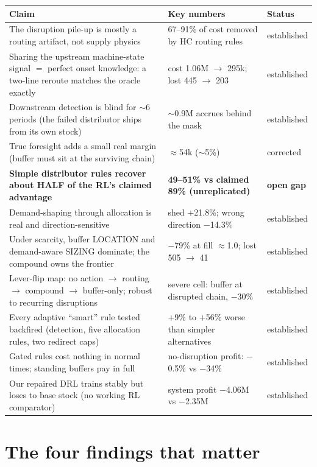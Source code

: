 \documentclass[11pt]{article}
\begin{document}
\begin{table}[h]
\centering\small
\begin{tabular}{@{}p{9.4cm} p{4.3cm} l@{}}
\toprule
\textbf{Claim} & \textbf{Key numbers} & \textbf{Status} \\
\midrule
The disruption pile-up is mostly a routing artifact, not supply physics &
67--91\% of cost removed by HC routing rules & established \\
Sharing the upstream machine-state signal $=$ perfect onset knowledge: a two-line
reroute matches the oracle exactly &
cost 1.06M $\to$ 295k; lost 445 $\to$ 203 & established \\
Downstream detection is blind for $\sim$6 periods (the failed distributor ships from
its own stock) &
$\sim$0.9M accrues behind the mask & established \\
True foresight adds a small real margin (buffer must sit at the surviving chain) &
$\approx$54k ($\sim$5\%) & corrected \\
\textbf{Simple distributor rules recover about HALF of the RL's claimed advantage} &
\textbf{49--51\% vs claimed 89\% (unreplicated)} & \textbf{open gap} \\
Demand-shaping through allocation is real and direction-sensitive &
shed $+$21.8\%; wrong direction $-$14.3\% & established \\
Under scarcity, buffer LOCATION and demand-aware SIZING dominate; the compound owns
the frontier &
$-$79\% at fill $\approx$1.0; lost 505 $\to$ 41 & established \\
Lever-flip map: no action $\to$ routing $\to$ compound $\to$ buffer-only; robust to
recurring disruptions &
severe cell: buffer at disrupted chain, $-$30\% & established \\
Every adaptive ``smart'' rule tested backfired (detection, five allocation rules, two
redirect caps) &
$+$9\% to $+$56\% worse than simpler alternatives & established \\
Gated rules cost nothing in normal times; standing buffers pay in full &
no-disruption profit: $-$0.5\% vs $-$34\% & established \\
Our repaired DRL trains stably but loses to base stock (no working RL comparator) &
system profit $-$4.06M vs $-$2.35M & established \\
\bottomrule
\end{tabular}
\end{table}

\section{The four findings that matter}\label{sec:findings}
\end{document}
